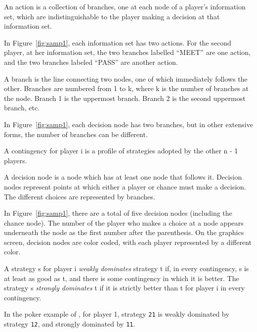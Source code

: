 \begin{helpglossary}
%
\setfooter{\thepage}{}{}{}{}{\thepage}%

\label{actiongloss}
An action is a collection of branches, one at each node of a player's information 
set, which are indistinguishable to the player making a decision at that 
information set. 

In Figure~\ref{fig:samp1}, each information set has two actions.  For the 
second player, at her information set, the two branches labelled ``MEET'' are one 
action, and the two branches labeled ``PASS'' are another action.  
 
\label{branchgloss}
A branch is the line connecting two nodes, one of which immediately 
follows the other.  Branches are numbered from 1 to k, where k is the 
number of branches at the node.  Branch 1 is the uppermost branch.  Branch 
2 is the second uppermost branch, etc. 

In Figure~\ref{fig:samp1}, each decision node has two branches, but in
other extensive forms, the number of branches can be different.

\label{continggloss}
A contingency for player i is a profile of strategies adopted by the other
 n - 1 players.

\label{decnodegloss}
A decision node is a node which has at least one node that follows it.  
Decision nodes represent points at which either a player or chance must 
make a decision.  The different choices are represented by branches.

In Figure~\ref{fig:samp1}, there are a total of five decision nodes (including the chance node). 
 The number of the player who makes a choice at a node appears underneath the
node as the first number after the parenthesis.  On the graphics screen,
decision nodes are color coded, with each player represented by a
different color.

\label{dominationgloss}
A strategy s for player i 
{\em weakly dominates} strategy t if, in every contingency, s 
is at least as good as t, and there is some contingency in which it is 
better.  The strategy s {\em strongly dominates} t if it is 
strictly better than t for player i in every contingency.  

In the poker example of , 
for player 1, strategy \verb+21+ is weakly dominated by strategy \verb+12+, 
and strongly dominated by \verb+11+. 


\end{helpglossary}
